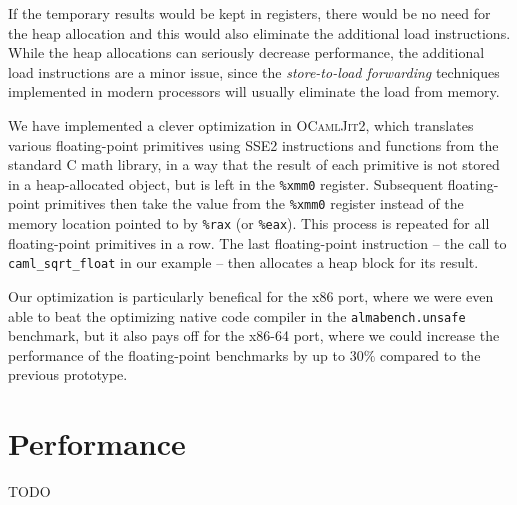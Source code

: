 \documentclass[12pt,a4paper,final]{article}
\begin{document}
If the temporary results would be kept in registers, there would be no need for
the heap allocation and this would also eliminate the additional load instructions.
While the heap allocations can seriously decrease performance, the additional
load instructions are a minor issue, since the \emph{store-to-load forwarding}
techniques \cite{Austin95,Lipasti96} implemented in modern processors will usually
eliminate the load from memory.

We have implemented a clever optimization in \textsc{OCamlJit2}, which translates
various floating-point primitives using SSE2 instructions and functions from the
standard C math library, in a way that the result of each primitive is not stored in
a heap-allocated object, but is left in the \texttt{\%xmm0} register. Subsequent
floating-point primitives then take the value from the \texttt{\%xmm0} register
instead of the memory location pointed to by \texttt{\%rax} (or \texttt{\%eax}).
This process is repeated for all floating-point primitives in a row. The last
floating-point instruction -- the call to \texttt{caml\_sqrt\_float} in our
example -- then allocates a heap block for its result.

Our optimization is particularly benefical for the x86 port, where we were even able
to beat the optimizing native code compiler in the \texttt{almabench.unsafe}
benchmark, but it also pays off for the x86-64 port, where we could increase the
performance of the floating-point benchmarks by up to $30\%$ compared to the
previous prototype.


\section{Performance} \label{section:Performance}

TODO
\end{document}
